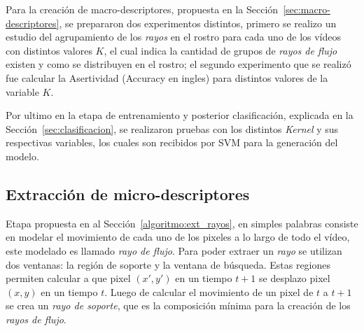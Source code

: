 Para la creación de macro-descriptores, propuesta en la Sección~\ref{sec:macro-descriptores}, se prepararon dos experimentos distintos, primero se realizo un estudio del agrupamiento de los \textit{rayos} en el rostro para cada uno de los vídeos con distintos valores $K$, el cual indica la cantidad de grupos de \textit{rayos de flujo} existen y como se distribuyen en el rostro; el segundo experimento que se realizó fue calcular la Asertividad (Accuracy en ingles) para distintos valores de la variable $K$.

Por ultimo en la etapa de entrenamiento y posterior clasificación, explicada en la Sección~\ref{sec:clasificacion}, se realizaron pruebas con los distintos \textit{Kernel} y sus respectivas variables, los cuales son recibidos por SVM para la generación del modelo.


\subsection{Extracción de micro-descriptores}
\label{exp:micro-descriptores}

Etapa propuesta en al Sección~\ref{algoritmo:ext_rayos}, en simples palabras consiste en modelar el movimiento de cada uno de los pixeles a lo largo de todo el vídeo, este modelado es llamado \textit{rayo de flujo}. Para poder extraer un \textit{rayo} se utilizan dos ventanas: la región de soporte y la ventana de búsqueda. Estas regiones permiten calcular a que pixel $(x',y')$ en un tiempo $t+1$ se desplazo pixel $(x,y)$ en un tiempo $t$. Luego de calcular el movimiento de un pixel de $t$ a $t+1$ se crea un \textit{rayo de soporte}, que es la composición mínima para la creación de los \textit{rayos de flujo}.



